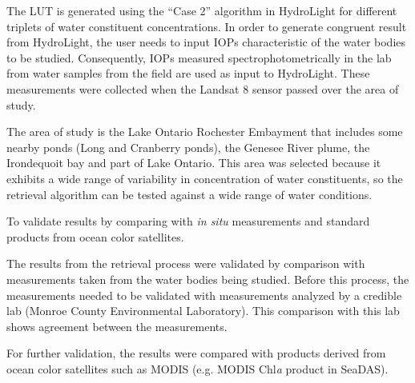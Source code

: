 \begin{enumerate}
The LUT is generated using the ``Case 2'' algorithm in HydroLight for different triplets of water constituent concentrations. In order to generate congruent result from HydroLight, the user needs to input IOPs characteristic of the water bodies to be studied. Consequently, IOPs measured spectrophotometrically in the lab from water samples from the field are used as input to HydroLight. These measurements were collected when the Landsat 8 sensor passed over the area of study.

The area of study is the Lake Ontario Rochester Embayment that includes some nearby ponds (Long and Cranberry ponds), the Genesee River plume, the Irondequoit bay and part of Lake Ontario. This area was selected because it exhibits a wide range of variability in concentration of water constituents, so the retrieval algorithm can be tested against a wide range of water conditions.
 
	{\bf \item To validate results by comparing with {\it in situ} measurements and standard products from ocean color satellites.}

The results from the retrieval process were validated by comparison with measurements taken from the water bodies being studied. Before this process, the measurements needed to be validated with measurements analyzed by a credible lab (Monroe County Environmental Laboratory). This comparison with this lab shows agreement between the measurements. 

For further validation, the results were compared with products derived from ocean color satellites such as MODIS (e.g. MODIS Chl{\it a} product in SeaDAS).


\end{enumerate}

